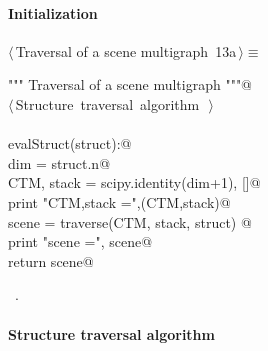 \documentclass[11pt,oneside]{article}	%
\begin{document}
\paragraph{Initialization}

\begin{flushleft} \small \label{scrap26}
\protect{}$\langle\,$Traversal of a scene multigraph\nobreak\ {\footnotesize 13a}$\,\rangle\equiv$
\vspace{-1ex}
\begin{list}{}{} \item
\mbox{}\verb@""" Traversal of a scene multigraph """@\\
\mbox{}\verb@@\hbox{$\langle\,$Structure traversal algorithm\nobreak\ {\footnotesize {}}$\,\rangle$}\verb@@\\
\mbox{}\verb@@\\
\mbox{}\verb@def evalStruct(struct):@\\
\mbox{}\verb@    dim = struct.n@\\
\mbox{}\verb@    CTM, stack = scipy.identity(dim+1), []@\\
\mbox{}\verb@    print "\n CTM,stack =",(CTM,stack)@\\
\mbox{}\verb@    scene = traverse(CTM, stack, struct) @\\
\mbox{}\verb@    print "\n scene =", scene@\\
\mbox{}\verb@    return scene@\\
\mbox{}\verb@@{\NWsep}
\end{list}
\vspace{-1ex}
\footnotesize\addtolength{\baselineskip}{-1ex}
\begin{list}{}{\setlength{\itemsep}{-\parsep}\setlength{\itemindent}{-\leftmargin}}
\item \NWtxtMacroRefIn\ .
\end{list}
\end{flushleft}

\paragraph{Structure traversal algorithm}
\end{document}
